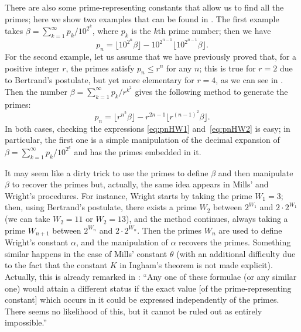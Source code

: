 \documentclass{article}
\theoremstyle{plain}
\begin{document}
There are also some prime-representing constants that allow us to find all the primes; 
here we show two examples that can be found in \cite[\S\,22.3, p.~345]{HaWr}.
The first example takes $\beta = \sum_{k=1}^{\infty} p_k/10^{2^{k}}$, 
where $p_k$ is the $k$th prime number; 
then we have
\begin{equation}
\label{eq:pnHW1}
  p_n = \lfloor {10^{2^{n}} \beta} \rfloor - 10^{2^{n-1}} \lfloor {10^{2^{n-1}} \beta} \rfloor.
\end{equation}
For the second example, let us assume that we have previously proved that, for a positive integer $r$, the primes satisfy $p_n \le r^n$ for any $n$; this is true for $r=2$ due to Bertrand's postulate, but yet more elementary for $r=4$, as we can see in \cite[Theorem~20, p.~17]{HaWr}.
Then the number $\beta = \sum_{k=1}^\infty p_k/r^{k^2}$ gives the following method to generate the primes:
\begin{equation}
\label{eq:pnHW2}
  p_n = \lfloor {r^{n^2}\beta} \rfloor - r^{2n-1} \lfloor {r^{(n-1)^2}\beta} \rfloor.
\end{equation}
In both cases, checking the expressions \eqref{eq:pnHW1} and~\eqref{eq:pnHW2} is easy; in particular, the first one is a simple manipulation of the decimal expansion of $\beta = \sum_{k=1}^\infty p_k/10^{2^{k}}$ and has the primes embedded in it.

It may seem like a dirty trick to use the primes to define $\beta$ and then manipulate $\beta$ to recover the primes but, actually, the same idea appears in Mills' and Wright's procedures. For instance, Wright starts by taking the prime $W_1 = 3$; then, using Bertrand's postulate, there exists a prime $W_2$ between $2^{W_1}$ and $2 \cdot 2^{W_1}$ (we can take $W_2=11$ or $W_2=13$), and the method continues, always taking a prime $W_{n+1}$ between $2^{W_n}$ and $2 \cdot 2^{W_n}$. Then the primes $W_n$ are used to define Wright's constant $\alpha$, and the manipulation of $\alpha$ recovers the primes. Something similar happens in the case of Mills' constant $\theta$ (with an additional difficulty due to the fact that the constant $K$ in Ingham's theorem is not made explicit). Actually, this is already remarked in \cite[\S\,22.3, p.~345]{HaWr}: ``Any one of these formulae (or any similar one) would attain a different status if the exact value [of the prime-representing constant] which occurs in it could be expressed independently of the primes. There seems no likelihood of this, but it cannot be ruled out as entirely impossible.''
\end{document}
